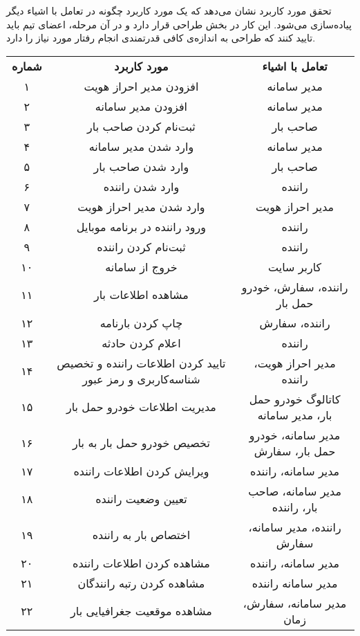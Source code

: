 
تحقق مورد کاربرد  نشان می‌دهد که یک مورد کاربرد چگونه در تعامل با اشیاء دیگر پیاده‌سازی می‌شود. این کار در بخش طراحی قرار دارد و در آن مرحله، اعضای تیم باید تایید کنند که طراحی به اندازه‌ی کافی قدرتمندی انجام رفتار مورد نیاز را دارد.

\begin{table}[hb]
	\centering
	\begin{tabular}{|c|c|c|}
		\cline{1-3}
		\textbf{شماره} & \textbf{مورد کاربرد} & \textbf{تعامل با اشیاء} \\ \cline{1-3}
	۱ & افزودن مدیر احراز هویت & مدیر سامانه \\
	۲ & افزودن مدیر سامانه & مدیر سامانه \\ 
	۳ & ثبت‌نام کردن صاحب بار & صاحب بار \\
	۴ & وارد شدن مدیر سامانه & مدیر سامانه \\
	۵ & وارد شدن صاحب بار & صاحب بار \\
	۶ & وارد شدن راننده & راننده \\
	۷ & وارد شدن مدیر احراز هویت & مدیر احراز هویت \\
	۸ & ورود راننده در برنامه موبایل & راننده \\
	۹ & ثبت‌نام کردن راننده & راننده \\
	۱۰ & خروج از سامانه & کاربر سایت \\
	۱۱ & مشاهده اطلاعات بار & راننده، سفارش، خودرو حمل بار \\
	۱۲ & چاپ کردن بارنامه & راننده، سفارش \\
	۱۳ & اعلام کردن حادثه & راننده \\
	۱۴ & تایید کردن اطلاعات راننده و تخصیص شناسه‌کاربری و رمز عبور & مدیر احراز هویت، راننده \\ 
	۱۵ & مدیریت اطلاعات خودرو حمل بار & کاتالوگ خودرو حمل بار،‌ مدیر سامانه \\
	۱۶ & تخصیص خودرو حمل بار به بار & مدیر سامانه، خودرو حمل بار، سفارش \\
	۱۷ & ویرایش کردن اطلاعات راننده & مدیر سامانه، راننده \\
	۱۸ & تعیین وضعیت راننده & مدیر سامانه، صاحب بار، راننده \\
	۱۹ & اختصاص بار به راننده & راننده، مدیر سامانه، سفارش \\
	۲۰ & مشاهده کردن اطلاعات راننده & مدیر سامانه، راننده \\
	۲۱ & مشاهده کردن رتبه رانندگان & مدیر سامانه راننده \\
	۲۲ & مشاهده موقعیت جغرافیایی بار & مدیر سامانه، سفارش، زمان \\

\end{tabular}
\end{table}

